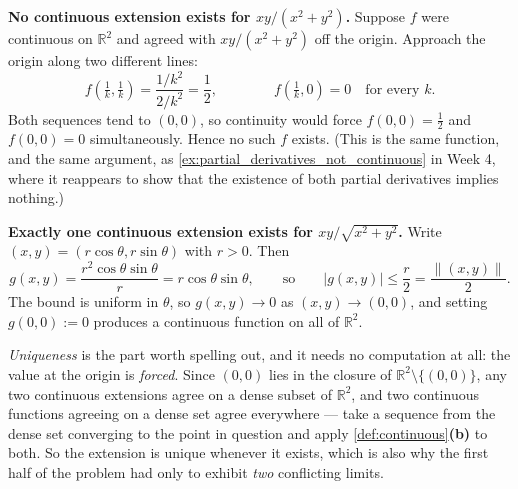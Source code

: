 \begin{exercisesolution}
\textbf{No continuous extension exists for $xy/(x^2+y^2)$.} Suppose $f$ were continuous on
$\mathbb{R}^2$ and agreed with $xy/(x^2+y^2)$ off the origin. Approach the origin along two
different lines:
\[f\!\left(\tfrac1k,\tfrac1k\right) = \frac{1/k^2}{2/k^2} = \frac12,
  \qquad\qquad
  f\!\left(\tfrac1k,0\right) = 0 \quad\text{for every } k.\]
Both sequences tend to $(0,0)$, so continuity would force
$f(0,0) = \tfrac12$ and $f(0,0) = 0$ simultaneously. Hence no such $f$ exists. (This is the same
function, and the same argument, as \cref{ex:partial_derivatives_not_continuous} in Week 4,
where it reappears to show that the existence of both partial derivatives implies nothing.)

\textbf{Exactly one continuous extension exists for $xy/\sqrt{x^2+y^2}$.} Write
$(x,y) = (r\cos\theta, r\sin\theta)$ with $r > 0$. Then
\[g(x,y) = \frac{r^2\cos\theta\sin\theta}{r} = r\cos\theta\sin\theta,
  \qquad\text{so}\qquad |g(x,y)| \leq \frac r2 = \frac{\lVert(x,y)\rVert}{2}.\]
The bound is uniform in $\theta$, so $g(x,y) \to 0$ as $(x,y) \to (0,0)$, and setting
$g(0,0) := 0$ produces a continuous function on all of $\mathbb{R}^2$.

\textit{Uniqueness} is the part worth spelling out, and it needs no computation at all: the value
at the origin is \emph{forced}. Since $(0,0)$ lies in the closure of
$\mathbb{R}^2\setminus\{(0,0)\}$, any two continuous extensions agree on a dense subset of
$\mathbb{R}^2$, and two continuous functions agreeing on a dense set agree everywhere --- take a
sequence from the dense set converging to the point in question and apply
\cref{def:continuous}\textbf{(b)} to both. So the extension is unique whenever it exists, which
is also why the first half of the problem had only to exhibit \emph{two} conflicting limits.
\end{exercisesolution}

